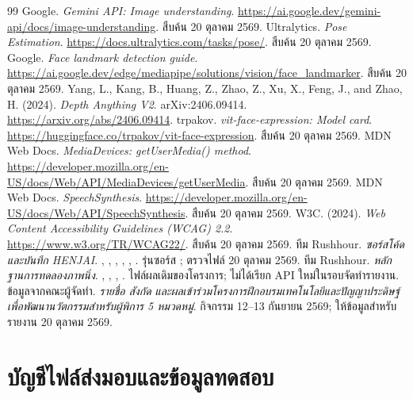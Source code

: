 \clearpage{}
\begin{thebibliography}{99}
 Google. \textit{Gemini API: Image understanding}. \url{https://ai.google.dev/gemini-api/docs/image-understanding}. สืบค้น 20 ตุลาคม 2569.
 Ultralytics. \textit{Pose Estimation}. \url{https://docs.ultralytics.com/tasks/pose/}. สืบค้น 20 ตุลาคม 2569.
 Google. \textit{Face landmark detection guide}. \url{https://ai.google.dev/edge/mediapipe/solutions/vision/face_landmarker}. สืบค้น 20 ตุลาคม 2569.
 Yang, L., Kang, B., Huang, Z., Zhao, Z., Xu, X., Feng, J., and Zhao, H. (2024). \textit{Depth Anything V2}. arXiv:2406.09414. \url{https://arxiv.org/abs/2406.09414}.
 trpakov. \textit{vit-face-expression: Model card}. \url{https://huggingface.co/trpakov/vit-face-expression}. สืบค้น 20 ตุลาคม 2569.
 MDN Web Docs. \textit{MediaDevices: getUserMedia() method}. \url{https://developer.mozilla.org/en-US/docs/Web/API/MediaDevices/getUserMedia}. สืบค้น 20 ตุลาคม 2569.
 MDN Web Docs. \textit{SpeechSynthesis}. \url{https://developer.mozilla.org/en-US/docs/Web/API/SpeechSynthesis}. สืบค้น 20 ตุลาคม 2569.
 W3C. (2024). \textit{Web Content Accessibility Guidelines (WCAG) 2.2}. \url{https://www.w3.org/TR/WCAG22/}. สืบค้น 20 ตุลาคม 2569.
 ทีม Rushhour. \textit{ซอร์สโค้ดและบันทึก HENJAI}. , , , , , . รุ่นซอร์ส ; ตรวจไฟล์ 20 ตุลาคม 2569.
 ทีม Rushhour. \textit{หลักฐานการทดลองภาพนิ่ง}. , , , . ไฟล์ผลเดิมของโครงการ; ไม่ได้เรียก API ใหม่ในรอบจัดทำรายงาน.
 ข้อมูลจากคณะผู้จัดทำ. \textit{รายชื่อ สังกัด และผลเข้าร่วมโครงการฝึกอบรมเทคโนโลยีและปัญญาประดิษฐ์เพื่อพัฒนานวัตกรรมสำหรับผู้พิการ 5 หมวดหมู่}. กิจกรรม 12--13 กันยายน 2569; ให้ข้อมูลสำหรับรายงาน 20 ตุลาคม 2569.
\end{thebibliography}
\appendix
\renewcommand{\chaptername}{ภาคผนวก}
\chapter{บัญชีไฟล์ส่งมอบและข้อมูลทดสอบ}
